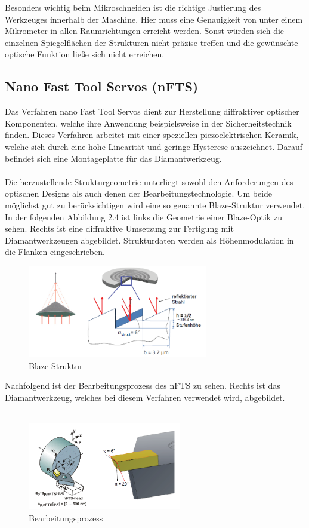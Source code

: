 \documentclass[12pt,a4paper,bibliography=totocnumbered,listof=totocnumbered]{scrartcl}
\begin{document}
\break
Besonders wichtig beim Mikroschneiden ist die richtige Justierung des Werkzeuges innerhalb der Maschine. Hier muss eine Genauigkeit von unter einem Mikrometer in allen Raumrichtungen erreicht werden. Sonst würden sich die einzelnen Spiegelflächen der Strukturen nicht präzise treffen und die gewünschte optische Funktion ließe sich nicht erreichen.




\subsection{Nano Fast Tool Servos (nFTS)}
Das Verfahren nano Fast Tool Servos dient zur Herstellung diffraktiver optischer Komponenten, welche ihre Anwendung beispielsweise in der Sicherheitstechnik finden. Dieses Verfahren arbeitet mit einer speziellen piezoelektrischen Keramik, welche sich durch eine hohe Linearität und geringe Hysterese auszeichnet. Darauf befindet sich eine Montageplatte für das Diamantwerkzeug. \\ \\
Die herzustellende Strukturgeometrie unterliegt sowohl den Anforderungen des optischen Designs als auch denen der Bearbeitungstechnologie. Um beide möglichst gut zu berücksichtigen wird eine so genannte Blaze-Struktur verwendet. In der folgenden Abbildung 2.4 ist links die Geometrie einer Blaze-Optik zu sehen. Rechts ist eine diffraktive Umsetzung zur Fertigung mit Diamantwerkzeugen abgebildet. Strukturdaten werden als Höhenmodulation in die Flanken eingeschrieben. 
\begin{figure}[htbp]
\centering 
\includegraphics[width=0.7\textwidth]{Blaze_Optik.PNG}
\caption [Gla09]{Blaze-Struktur}
\label{fig:Bild4}
\end{figure}
\break
Nachfolgend ist der Bearbeitungsprozess des nFTS zu sehen. Rechts ist das Diamantwerkzeug, welches bei diesem Verfahren verwendet wird, abgebildet. \\ \\ 
\begin{figure}[htbp]
\centering 
\includegraphics[width=0.6\textwidth]{nano.PNG}
\caption [Gla09]{Bearbeitungsprozess}
\label{fig:Bild5}
\end{figure}
\end{document}
